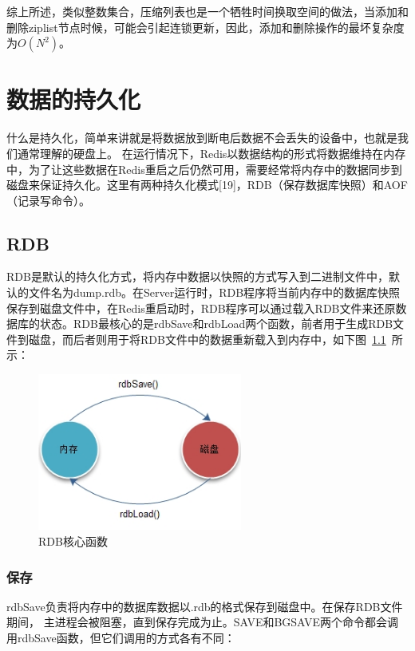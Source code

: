 \documentclass{zjutthesis}
\begin{document}
综上所述，类似整数集合，压缩列表也是一个牺牲时间换取空间的做法，当添加和删除ziplist节点时候，可能会引起连锁更新，因此，添加和删除操作的最坏复杂度为$O(N^{2})$。


\chapter{数据的持久化}
什么是持久化，简单来讲就是将数据放到断电后数据不会丢失的设备中，也就是我们通常理解的硬盘上。
在运行情况下，Redis以数据结构的形式将数据维持在内存中，为了让这些数据在Redis重启之后仍然可用，需要经常将内存中的数据同步到磁盘来保证持久化。这里有两种持久化模式[19]，RDB（保存数据库快照）和AOF（记录写命令）。

\section{RDB}
RDB是默认的持久化方式，将内存中数据以快照的方式写入到二进制文件中，默认的文件名为dump.rdb。在Server运行时，RDB程序将当前内存中的数据库快照保存到磁盘文件中，在Redis重启动时，RDB程序可以通过载入RDB文件来还原数据库的状态。RDB最核心的是rdbSave和rdbLoad两个函数，前者用于生成RDB文件到磁盘，而后者则用于将RDB文件中的数据重新载入到内存中，如下图~\ref{fig:RDB}~所示：
\begin{figure}[H]
\centering
\includegraphics[width=0.6\textwidth]{RDB}
\caption{RDB核心函数}\label{fig:RDB}
\vspace{\baselineskip} %
\end{figure}

\subsection{保存}
rdbSave负责将内存中的数据库数据以.rdb的格式保存到磁盘中。在保存RDB文件期间，
主进程会被阻塞，直到保存完成为止。SAVE和BGSAVE两个命令都会调用rdbSave函数，但它们调用的方式各有不同：
\end{document}
